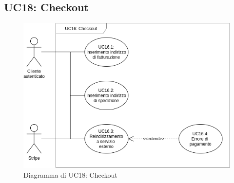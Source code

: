         \subsection{UC18: Checkout}
        \label{sec:UC18}
            \begin{figure}[!ht]
                \caption{Diagramma di UC18: Checkout}
                \vspace{10px}
                \includegraphics[scale=0.5]{../../../Images/AnalisiRequisiti/UC18}
                \centering
            \end{figure}
